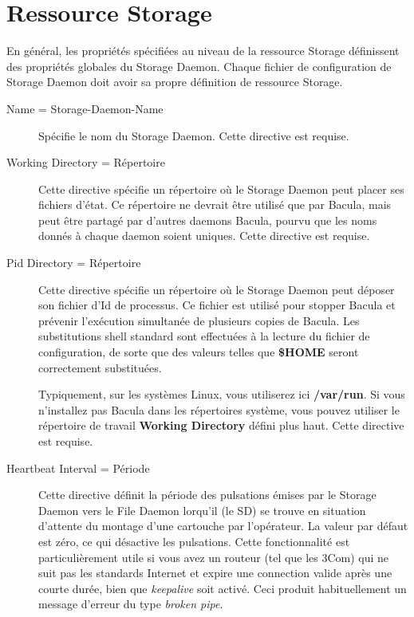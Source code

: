 \section{Ressource Storage}
\label{StorageResource}

En g\'en\'eral, les propri\'et\'es sp\'ecifi\'ees au niveau de la ressource Storage d\'efinissent 
des propri\'et\'es globales du Storage Daemon. Chaque fichier de configuration de 
Storage Daemon doit avoir sa propre d\'efinition de ressource Storage.

\begin{description}

\item [Name = \lt{}Storage-Daemon-Name\gt{}]
   Sp\'ecifie le nom du Storage Daemon. Cette directive est requise.
\item [Working Directory = \lt{}R\'epertoire\gt{}]
   Cette directive sp\'ecifie un r\'epertoire o\`u le Storage Daemon peut placer ses fichiers 
   d'\'etat. Ce r\'epertoire ne devrait \^etre utilis\'e que par Bacula, mais peut \^etre 
   partag\'e par d'autres daemons Bacula, pourvu que les noms donn\'es \`a chaque daemon 
   soient uniques. Cette directive est requise.

\item [Pid Directory = \lt{}R\'epertoire\gt{}]
      Cette directive sp\'ecifie un r\'epertoire o\`u le Storage Daemon peut d\'eposer son fichier
d'Id de processus. Ce fichier est utilis\'e pour stopper Bacula et pr\'evenir l'ex\'ecution
simultan\'ee de plusieurs copies de Bacula. Les substitutions shell standard sont
effectu\'ees \`a la lecture du fichier de configuration, de sorte que des valeurs
telles que {\bf \$HOME} seront correctement substitu\'ees. 
   
Typiquement, sur les syst\`emes Linux, vous utiliserez ici {\bf /var/run}. Si vous
n'installez pas Bacula dans les r\'epertoires syst\`eme, vous pouvez utiliser le
r\'epertoire de travail {\bf Working Directory} d\'efini plus haut.
Cette directive est requise.

\item [Heartbeat Interval = \lt{}P\'eriode\gt{}]
   Cette directive d\'efinit la p\'eriode des pulsations \'emises par le Storage Daemon 
   vers le File Daemon lorqu'il (le SD) se trouve en situation d'attente du montage 
   d'une cartouche par l'op\'erateur. La valeur par d\'efaut est z\'ero, ce qui d\'esactive 
   les pulsations. Cette fonctionnalit\'e est particuli\`erement utile si vous avez un 
   routeur (tel que les 3Com) qui ne suit pas les standards Internet et expire une 
   connection valide apr\`es une courte dur\'ee, bien que {\it keepalive} soit activ\'e. 
   Ceci produit habituellement un message d'erreur du type {\it broken pipe}.


\end{description}
